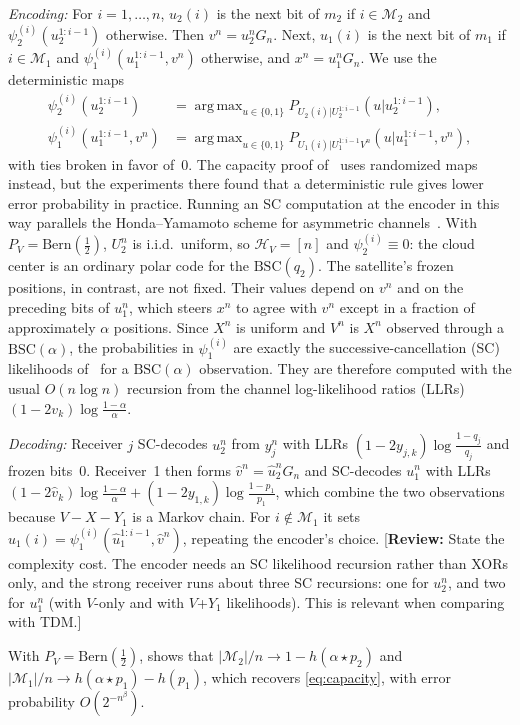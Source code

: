 \documentclass[conference]{IEEEtran}
\DeclareMathOperator*{\argmax}{arg\,max}
\newcommand{\Hs}{\mathcal{H}}
\newcommand{\Ms}{\mathcal{M}}
\newcommand{\Bern}{\mathrm{Bern}}
\newcommand{\BSC}{\mathrm{BSC}}
\newcommand{\reviewnote}[1]{{\color{red}\footnotesize[\textbf{Review:} #1]}}
\begin{document}
\emph{Encoding:} For $i=1,\dots,n$, $u_2(i)$ is the next bit of $m_2$ if $i\in\Ms_2$ and $\psi_2^{(i)}(u_2^{1:i-1})$ otherwise. Then $v^n=u_2^nG_n$. Next, $u_1(i)$ is the next bit of $m_1$ if $i\in\Ms_1$ and $\psi_1^{(i)}(u_1^{1:i-1},v^n)$ otherwise, and $x^n=u_1^nG_n$. We use the deterministic maps
\begin{align}
\psi_2^{(i)}(u_2^{1:i-1})&=\argmax_{u\in\{0,1\}}P_{U_2(i)|U_2^{1:i-1}}(u|u_2^{1:i-1}),\nonumber\\
\psi_1^{(i)}(u_1^{1:i-1},v^n)&=\argmax_{u\in\{0,1\}}P_{U_1(i)|U_1^{1:i-1}V^n}(u|u_1^{1:i-1},v^n),
\label{eq:psi}
\end{align}
with ties broken in favor of~0. The capacity proof of~\cite{6975233} uses randomized maps instead, but the experiments there found that a deterministic rule gives lower error probability in practice. Running an SC computation at the encoder in this way parallels the Honda--Yamamoto scheme for asymmetric channels~\cite{honda2013}. With $P_V=\Bern(\frac12)$, $U_2^n$ is i.i.d.\ uniform, so $\Hs_V=[n]$ and $\psi_2^{(i)}\equiv0$: the cloud center is an ordinary polar code for the $\BSC(q_2)$. The satellite's frozen positions, in contrast, are not fixed. Their values depend on $v^n$ and on the preceding bits of $u_1^n$, which steers $x^n$ to agree with $v^n$ except in a fraction of approximately $\alpha$ positions. Since $X^n$ is uniform and $V^n$ is $X^n$ observed through a $\BSC(\alpha)$, the probabilities in $\psi_1^{(i)}$ are exactly the successive-cancellation (SC) likelihoods of~\cite{ArikanPolar} for a $\BSC(\alpha)$ observation. They are therefore computed with the usual $O(n\log n)$ recursion from the channel log-likelihood ratios (LLRs) $(1-2v_k)\log\frac{1-\alpha}{\alpha}$.

\emph{Decoding:} Receiver $j$ SC-decodes $u_2^n$ from $y_j^n$ with LLRs $(1-2y_{j,k})\log\frac{1-q_j}{q_j}$ and frozen bits~0. Receiver~1 then forms $\hat v^n=\hat u_2^nG_n$ and SC-decodes $u_1^n$ with LLRs $(1-2\hat v_k)\log\frac{1-\alpha}{\alpha}+(1-2y_{1,k})\log\frac{1-p_1}{p_1}$, which combine the two observations because $V-X-Y_1$ is a Markov chain. For $i\notin\Ms_1$ it sets $\hat u_1(i)=\psi_1^{(i)}(\hat u_1^{1:i-1},\hat v^n)$, repeating the encoder's choice. \reviewnote{State the complexity cost. The encoder needs an SC likelihood recursion rather than XORs only, and the strong receiver runs about three SC recursions: one for $u_2^n$, and two for $u_1^n$ (with $V$-only and with $V$+$Y_1$ likelihoods). This is relevant when comparing with TDM.}

With $P_V=\Bern(\frac12)$, \cite{6975233} shows that $|\Ms_2|/n\to1-h(\alpha\star p_2)$ and $|\Ms_1|/n\to h(\alpha\star p_1)-h(p_1)$, which recovers \eqref{eq:capacity}, with error probability $O(2^{-n^\beta})$.
\end{document}
